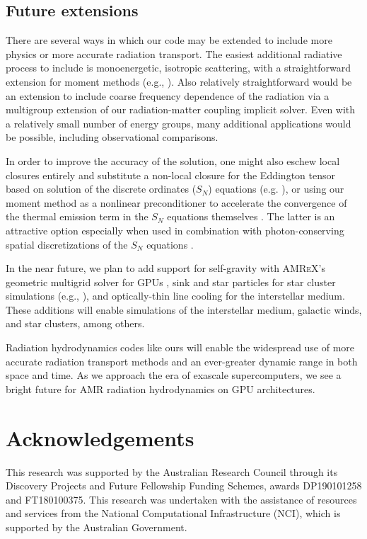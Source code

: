 \documentclass[fleqn,usenatbib]{mnras}
\begin{document}
\subsection{Future extensions}
There are several ways in which our code may be extended to include more physics or more accurate radiation transport. The easiest additional radiative process to include is monoenergetic, isotropic scattering, with a straightforward extension for moment methods (e.g., \citealt{Jiang12a}). Also relatively straightforward would be an extension to include coarse frequency dependence of the radiation via a multigroup extension of our radiation-matter coupling implicit solver. Even with a relatively small number of energy groups, many additional applications would be possible, including observational comparisons.

In order to improve the accuracy of the solution, one might also eschew local closures entirely and substitute a non-local closure for the Eddington tensor based on solution of the discrete ordinates ($S_N$) equations (e.g. \citealt{Davis_2012,Jiang12a}), or using our moment method as a nonlinear preconditioner to accelerate the convergence of the thermal emission term in the $S_N$ equations themselves \citep{Park_2012}. The latter is an attractive option especially when used in combination with photon-conserving spatial discretizations of the $S_N$ equations \citep{Adams97a,Adams_2001}.

In the near future, we plan to add support for self-gravity with \textsc{AMReX}'s geometric multigrid solver for GPUs \citep{AMReX_JOSS}, sink and star particles for star cluster simulations (e.g., \citealt{Krumholz04a, Offner09a}), and optically-thin line cooling for the interstellar medium. These additions will enable simulations of the interstellar medium, galactic winds, and star clusters, among others.

Radiation hydrodynamics codes like ours will enable the widespread use of more accurate radiation transport methods and an ever-greater dynamic range in both space and time. As we approach the era of exascale supercomputers, we see a bright future for AMR radiation hydrodynamics on GPU architectures.

\section*{Acknowledgements}

This research was supported by the Australian Research Council through its Discovery Projects and Future Fellowship Funding Schemes, awards DP190101258 and FT180100375. This research was undertaken with the assistance of resources and services from the National Computational Infrastructure (NCI), which is supported by the Australian Government.
\end{document}
